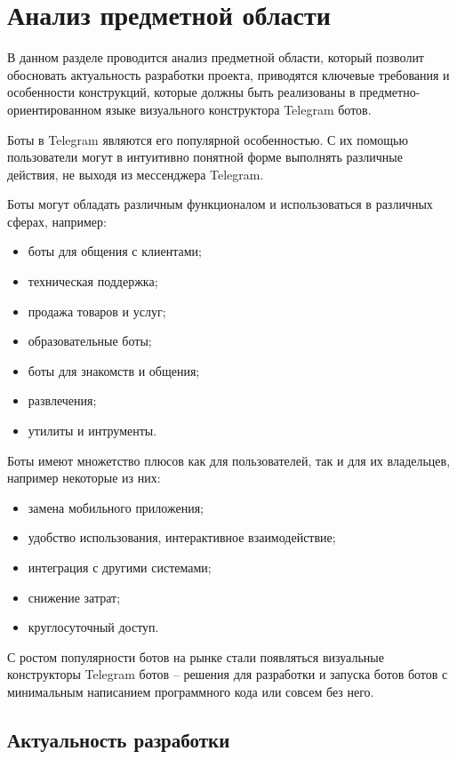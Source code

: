 
\section{Анализ предметной области}

В данном разделе проводится анализ предметной области,
который позволит обосновать актуальность разработки проекта,
приводятся ключевые требования и особенности конструкций,
которые должны быть реализованы в предметно-ориентированном языке визуального конструктора Telegram ботов.

Боты в Telegram являются его популярной особенностью.
С их помощью пользователи могут в интуитивно понятной форме выполнять различные действия, не выходя из мессенджера Telegram.

Боты могут обладать различным функционалом и использоваться в различных сферах, например:
\begin{itemize}
    \item боты для общения с клиентами;
    \item техническая поддержка;
    \item продажа товаров и услуг;
    \item образовательные боты;
    \item боты для знакомств и общения;
    \item развлечения;
    \item утилиты и интрументы.
\end{itemize}

Боты имеют множетство плюсов как для пользователей, так и для их владельцев, например некоторые из них:
\begin{itemize}
    \item замена мобильного приложения;
    \item удобство использования, интерактивное взаимодействие;
    \item интеграция с другими системами;
    \item снижение затрат;
    \item круглосуточный доступ.
\end{itemize}

С ростом популярности ботов на рынке стали появляться визуальные конструкторы Telegram ботов --
решения для разработки и запуска ботов ботов с минимальным написанием программного кода или совсем без него. 

\subsection{Актуальность разработки}

